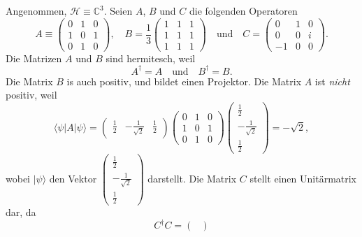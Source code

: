 \begin{beispiel}
	Angenommen, $\mathcal{H}\equiv \mathbb{C}^3$. Seien $A$, $B$ und $C$ die folgenden Operatoren
	\begin{equation}
		A \equiv \begin{pmatrix}
			0 & 1 & 0 \\
			1 & 0 & 1 \\
			0 & 1 & 0
		\end{pmatrix}, \quad B = \frac13\begin{pmatrix}
			1 & 1 & 1 \\
			1 & 1 & 1 \\
			1 & 1 & 1
		\end{pmatrix}\quad\text{und}\quad 
		C = \begin{pmatrix}
			0 & 1 & 0 \\
			0 & 0 & i \\
			-1 & 0 & 0
		\end{pmatrix}.
	\end{equation}
	Die Matrizen $A$ und $B$ sind hermitesch, weil
	\begin{equation}
		A^\dag = A\quad \text{und}\quad B^\dag = B.
	\end{equation}
	Die Matrix $B$ is auch positiv, und bildet einen Projektor. Die Matrix $A$ ist \emph{nicht} positiv, weil
	\begin{equation}
		\langle \psi|A|\psi\rangle = 
		\begin{pmatrix}
			\frac12 & -\frac1{\sqrt2} & \frac12
		\end{pmatrix}
		\begin{pmatrix}
			0 & 1 & 0 \\
			1 & 0 & 1 \\
			0 & 1 & 0
		\end{pmatrix}
		\begin{pmatrix}
			\frac12 \\ -\frac1{\sqrt2} \\ \frac12
		\end{pmatrix} = -\sqrt{2},
	\end{equation}
	wobei $|\psi\rangle$ den Vektor $\left(\begin{smallmatrix}
			\frac12 \\ -\frac1{\sqrt2} \\ \frac12
		\end{smallmatrix}\right)$ darstellt.
	Die Matrix $C$ stellt einen Unitärmatrix dar, da
	\begin{equation}
		C^\dag C = \begin{pmatrix}

\end{pmatrix}
\end{equation}
\end{beispiel}
